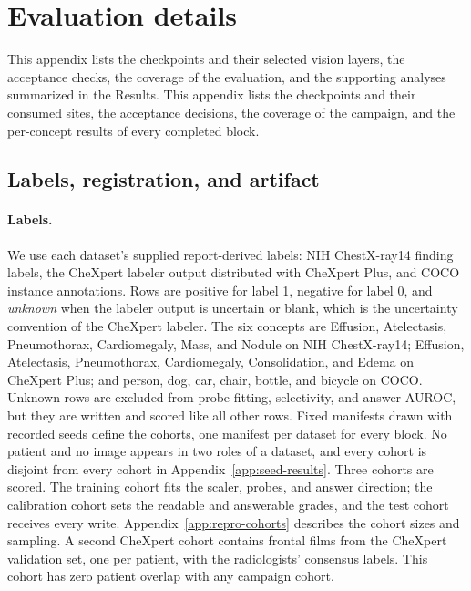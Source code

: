 \section{Evaluation details}
\label{app:campaign}
This appendix lists the checkpoints and their selected vision layers, the acceptance checks, the coverage of the evaluation, and the supporting analyses summarized in the Results.
This appendix lists the checkpoints and their consumed sites, the acceptance decisions, the coverage of the campaign, and the per-concept results of every completed block.

\subsection{Labels, registration, and artifact}
\label{app:cf-labels}

\paragraph{Labels.} We use each dataset's supplied report-derived labels: NIH ChestX-ray14 finding labels\cite{wang2017chestxray}, the CheXpert labeler output\cite{irvin2019chexpert} distributed with CheXpert Plus\cite{chambon2024chexpertplus}, and COCO instance annotations\cite{lin2014coco}. Rows are positive for label 1, negative for label 0, and \emph{unknown} when the labeler output is uncertain or blank, which is the uncertainty convention of the CheXpert labeler\cite{irvin2019chexpert}. The six concepts are Effusion, Atelectasis, Pneumothorax, Cardiomegaly, Mass, and Nodule on NIH ChestX-ray14; Effusion, Atelectasis, Pneumothorax, Cardiomegaly, Consolidation, and Edema on CheXpert Plus; and person, dog, car, chair, bottle, and bicycle on COCO. Unknown rows are excluded from probe fitting, selectivity, and answer AUROC, but they are written and scored like all other rows. Fixed manifests drawn with recorded seeds define the cohorts, one manifest per dataset for every block. No patient and no image appears in two roles of a dataset, and every cohort is disjoint from every cohort in Appendix~\ref{app:seed-results}. Three cohorts are scored. The training cohort fits the scaler, probes, and answer direction; the calibration cohort sets the readable and answerable grades, and the test cohort receives every write. Appendix~\ref{app:repro-cohorts} describes the cohort sizes and sampling. A second CheXpert cohort contains \cfValidRows{} frontal films from the CheXpert validation set, one per patient, with the radiologists' consensus labels\cite{irvin2019chexpert}. This cohort has zero patient overlap with any campaign cohort.


